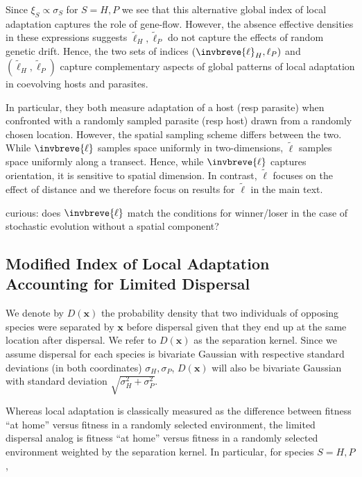 \documentclass{article}
\begin{document}
Since \(\xi_S\propto\sigma_S\) for \(S=H,P\) we see that this
alternative global index of local adaptation captures the role of
gene-flow. However, the absence effective densities in these expressions
suggests \(\tilde{\ell}_H,\tilde{\ell}_P\) do not capture the effects of
random genetic drift. Hence, the two sets of indices
\((\invbreve{\ell}_H,{\ell}_P)\) and \((\tilde{\ell}_H,\tilde{\ell}_P)\)
capture complementary aspects of global patterns of local adaptation in
coevolving hosts and parasites.

In particular, they both measure adaptation of a host (resp parasite)
when confronted with a randomly sampled parasite (resp host) drawn from
a randomly chosen location. However, the spatial sampling scheme differs
between the two. While \(\invbreve{\ell}\) samples space uniformly in
two-dimensions, \(\tilde{\ell}\) samples space uniformly along a
transect. Hence, while \(\invbreve{\ell}\) captures orientation, it is
sensitive to spatial dimension. In contrast, \(\tilde{\ell}\) focuses on
the effect of distance and we therefore focus on results for
\(\tilde{\ell}\) in the main text.

curious: does \(\invbreve{\ell}\) match the conditions for winner/loser
in the case of stochastic evolution without a spatial component?

\hypertarget{modified-index-of-local-adaptation-accounting-for-limited-dispersal}{%
\subsection{Modified Index of Local Adaptation Accounting for Limited
Dispersal}\label{modified-index-of-local-adaptation-accounting-for-limited-dispersal}}

We denote by \(D(\pmb x)\) the probability density that two individuals
of opposing species were separated by \(\pmb x\) before dispersal given
that they end up at the same location after dispersal. We refer to
\(D(\pmb x)\) as the separation kernel. Since we assume dispersal for
each species is bivariate Gaussian with respective standard deviations
(in both coordinates) \(\sigma_H,\sigma_P\), \(D(\pmb x)\) will also be
bivariate Gaussian with standard deviation
\(\sqrt{\sigma_H^2+\sigma_P^2}\).

Whereas local adaptation is classically measured as the difference
between fitness ``at home'' versus fitness in a randomly selected
environment, the limited dispersal analog is fitness ``at home'' versus
fitness in a randomly selected environment weighted by the separation
kernel. In particular, for species \(S=H,P\),
\end{document}
